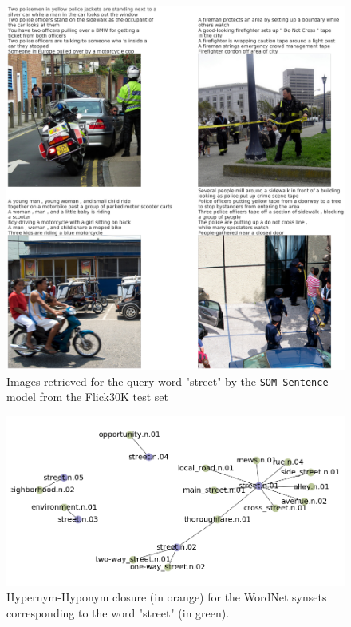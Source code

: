 \documentclass[a4paper]{standalone}
\begin{document}
\begin{figure}[h]
    \centering
    \includegraphics[width=\textwidth]{images/image_retrieval_street_fail.png}
    \caption{Images retrieved for the query word "street" by the \texttt{SOM-Sentence} model from the Flick30K test set}
    \label{fig:ImageRetrievalStreetFail}
\end{figure}

\begin{figure}[h]
    \centering
    \includegraphics[width=\textwidth]{images/image_retrieval_fail_synsets.png}
    \caption{Hypernym-Hyponym closure (in orange) for the WordNet synsets corresponding to the word "street" (in green).}
    \label{fig:ImageRetrievalSynsets}
\end{figure}
\end{document}
